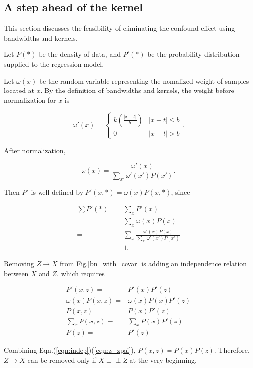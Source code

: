 \documentclass[a4 paper,12pt]{article}
\newcommand{\indep}{\perp \!\!\! \perp}
\begin{document}
\subsection{A step ahead of the kernel}

This section discusses the feasibility of eliminating the confound effect using bandwidths and kernels.

Let $P(*)$ be the density of data,
and $P'(*)$ be the probability distribution supplied to the regression model.

Let $\omega(x)$ be the random variable representing the nomalized weight of samples located at $x$.
By the definition of bandwidths and kernels,
the weight before normalization for $x$ is

\begin{equation}
   \omega'(x)=\begin{cases}
      k\left(\frac{\left|x-t\right|}{b}\right)&\left|x-t\right|\le b\\
      0&\left|x-t\right|>b
   \end{cases}.
\end{equation}

After normalization,

\begin{equation}
   \omega(x)=\frac{\omega'(x)}{\sum_{x'}\omega'(x')P(x')}.
\end{equation}

Then $P'$ is well-defined by $P'(x,*)=\omega(x)P(x,*)$, since

\begin{align}
   \sum P'(*)=&\sum_xP'(x)\\
   =&\sum_x\omega(x)P(x)\\
   =&\sum_x\frac{\omega'(x)P(x)}{\sum_{x'}\omega'(x')P(x')}\\
   =&1.
\end{align}

Removing $Z\to X$ from Fig.\ref{bn_with_covar} is adding an independence relation between $X$ and $Z$,
which requires

\begin{align}
   P'(x,z)=&P'(x)P'(z)\\
   \omega(x)P(x,z)=&\omega(x)P(x)P'(z)\\
   P(x,z)=&P(x)P'(z)\label{eqn:indep}\\
   \sum_x P(x,z)=&\sum_xP(x)P'(z)\\
   P(z)=&P'(z)\label{eqn:z_zpai}
\end{align}

Combining Eqn.(\ref{eqn:indep})(\ref{eqn:z_zpai}), $P(x,z)=P(x)P(z)$.
Therefore, $Z\to X$ can be removed only if $X\indep Z$ at the very beginning.
\end{document}
